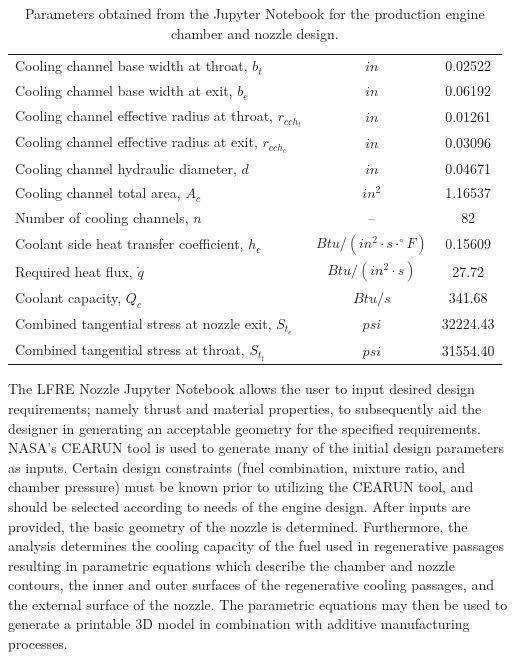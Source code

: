 \documentclass[]{aiaa-tc}%
\begin{document}
\begin{table}
\begin{center}
\begin{tabular}{| l | c | c |}
 Cooling channel base width at throat, $b_t$              & $in$        & 0.02522   \\
 Cooling channel base width at exit, $b_e$                & $in$        & 0.06192   \\
 Cooling channel effective radius at throat, $r_{cch_t}$  & $in$        & 0.01261   \\
 Cooling channel effective radius at exit, $r_{cch_e}$    & $in$        & 0.03096   \\
 Cooling channel hydraulic diameter, $d$                  & $in$        & 0.04671   \\
 Cooling channel total area, $A_c$                        & $in^2$      & 1.16537   \\
 Number of cooling channels, $n$                          & --  & 82        \\

 Coolant side heat transfer coefficient, $h_c$    & ${Btu}/({in^2\cdot s\cdot^{\circ}F})$   & 0.15609   \\
 Required heat flux, $\dot q$                          & ${Btu}/({in^2\cdot s})$                 & 27.72     \\
 Coolant capacity, $Q_c$                          & ${Btu}/{s}$                           & 341.68    \\
 
 Combined tangential stress at nozzle exit, $S_{t_e}$     & $psi$       & 32224.43  \\
 Combined tangential stress at throat, $S_{t_t}$          & $psi$       & 31554.40  \\
\hline
\end{tabular}
\end{center}
\caption{Parameters obtained from the Jupyter Notebook for the production engine chamber and nozzle design.}
\label{tab:engineparams}
\end{table}

The LFRE Nozzle Jupyter Notebook \cite{LFRE} allows the user to input desired design requirements; namely thrust and material properties, to subsequently aid the designer in generating an acceptable geometry for the specified requirements. NASA's CEARUN tool \cite{CEARUN} is used to generate many of the initial design parameters as inputs. Certain design constraints (fuel combination, mixture ratio, and chamber pressure) must be known prior to utilizing the CEARUN tool, and should be selected according to needs of the engine design. After inputs are provided, the basic geometry of the nozzle is determined. Furthermore, the analysis determines the cooling capacity of the fuel used in regenerative passages resulting in parametric equations which describe the chamber and nozzle contours, the inner and outer surfaces of the regenerative cooling passages, and the external surface of the nozzle. The parametric equations may then be used to generate a printable 3D model in combination with additive manufacturing processes.
\end{document}
